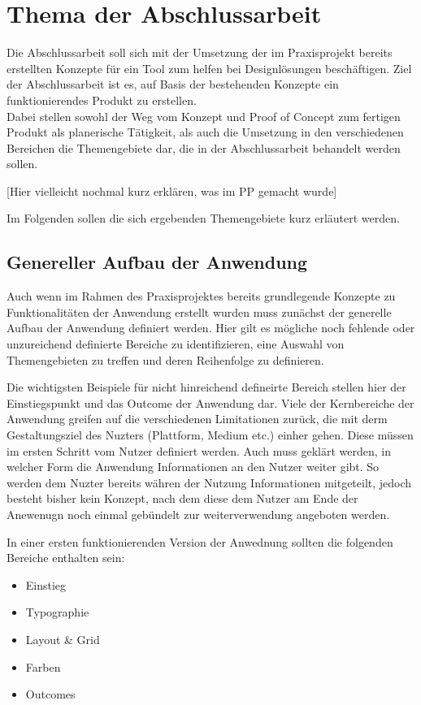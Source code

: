 \section{Thema der Abschlussarbeit}
Die Abschlussarbeit soll sich mit der Umsetzung der im Praxisprojekt bereits erstellten Konzepte für ein Tool zum helfen bei Designlösungen beschäftigen. Ziel der Abschlussarbeit ist es, auf Basis der bestehenden Konzepte ein funktionierendes Produkt zu erstellen.\\
Dabei stellen sowohl der Weg vom Konzept und Proof of Concept zum fertigen Produkt als planerische Tätigkeit, als auch die Umsetzung in den verschiedenen Bereichen die Themengebiete dar, die in der Abschlussarbeit behandelt werden sollen.

[Hier vielleicht nochmal kurz erklären, was im PP gemacht wurde]

Im Folgenden sollen die sich ergebenden Themengebiete kurz erläutert werden.

\subsection{Genereller Aufbau der Anwendung}
Auch wenn im Rahmen des Praxisprojektes bereits grundlegende Konzepte zu Funktionalitäten der Anwendung erstellt wurden muss zunächst der generelle Aufbau der Anwendung definiert werden.
Hier gilt es mögliche noch fehlende oder unzureichend definierte Bereiche zu identifizieren, eine Auswahl von Themengebieten zu treffen und deren Reihenfolge zu definieren.

Die wichtigsten Beispiele für nicht hinreichend defineirte Bereich stellen hier der Einstiegspunkt und das Outcome der Anwendung dar.
Viele der Kernbereiche der Anwendung greifen auf die verschiedenen Limitationen zurück, die mit derm Gestaltungsziel des Nuzters (Plattform, Medium etc.) einher gehen. Diese müssen im ersten Schritt vom Nutzer definiert werden.
Auch muss geklärt werden, in welcher Form die Anwendung Informationen an den Nutzer weiter gibt. So werden dem Nuzter bereits währen der Nutzung Informationen mitgeteilt, jedoch besteht bisher kein Konzept, nach dem diese dem Nutzer am Ende der Anewenugn noch einmal gebündelt zur weiterverwendung angeboten werden.

In einer ersten funktionierenden Version der Anwednung sollten die folgenden Bereiche enthalten sein:

\begin{itemize}
  \item Einstieg
  \item Typographie
  \item Layout \& Grid
  \item Farben
  \item Outcomes
\end{itemize}

